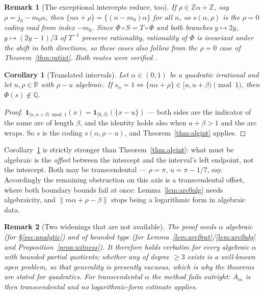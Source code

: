 \documentclass[11pt]{article}
\newtheorem{corollary}[theorem]{Corollary}
\newtheorem*{remark}{Remark}
\newcommand{\Q}{\mathbb{Q}}
\newcommand{\Z}{\mathbb{Z}}
\newcommand{\R}{\mathbb{R}}
\begin{document}
\begin{remark}[The exceptional intercepts reduce, too]
If $\rho\in\Z\alpha+\Z$, say $\rho=j_0-m_0\alpha$, then $\{n\alpha+\rho\}=\{(n-m_0)\alpha\}$ for all
$n$, so $s(\alpha,\rho)$ is the $\rho=0$ coding read from index $-m_0$. Since $\Phi\circ S=T\circ\Phi$
and both branches $y\mapsto2y$, $y\mapsto(2y-1)/3$ of $T^{-1}$ preserve rationality, rationality of
$\Phi$ is invariant under the shift in both directions, so these cases also follow from the $\rho=0$
case of Theorem~\ref{thm:ratint}. Both routes were verified \cite{Phase13Alg}.
\end{remark}

\begin{corollary}[Translated intervals]
\label{cor:translated}
Let $\alpha\in(0,1)$ be a quadratic irrational and let $u,\rho\in\R$ with $\rho-u$ algebraic. If
$s_n=1\iff\{n\alpha+\rho\}\in[u,u+\beta)\pmod 1$, then $\Phi(s)\notin\Q$.
\end{corollary}

\begin{proof}
$\mathbf 1_{[u,u+\beta)\bmod 1}(x)=\mathbf 1_{[0,\beta)}(\{x-u\})$ --- both sides are the indicator
of the same arc of length $\beta$, and the identity holds also when $u+\beta>1$ and the arc wraps.
So $s$ is the coding $s(\alpha,\rho-u)$, and Theorem~\ref{thm:algint} applies.
\end{proof}

Corollary~\ref{cor:translated} is strictly stronger than Theorem~\ref{thm:algint}: what must be
algebraic is the \emph{offset} between the intercept and the interval's left endpoint, not the
intercept. Both may be transcendental --- $\rho=\pi$, $u=\pi-1/7$, say. Accordingly the remaining
obstruction on this axis is a transcendental offset, where both boundary bounds fail at once:
Lemma~\ref{lem:arc0alg} needs algebraicity, and $\lVert m\alpha+\rho-\beta\rVert$ stops being a
logarithmic form in algebraic data.

\begin{remark}[Two widenings that are not available]
The proof needs $\alpha$ algebraic (for \S\ref{sec:analytic}) \emph{and} of bounded type (for
Lemma~\ref{lem:arc0rat}/\ref{lem:arc0alg} and Proposition~\ref{prop:witness}). It therefore holds
verbatim for every algebraic $\alpha$ with bounded partial quotients; whether any of degree $\ge3$
exists is a well-known open problem, so that generality is presently vacuous, which is why the
theorems are stated for quadratics. For transcendental $\alpha$ the method fails outright:
$A_m$ is then transcendental and no logarithmic-form estimate applies.
\end{remark}
\end{document}
